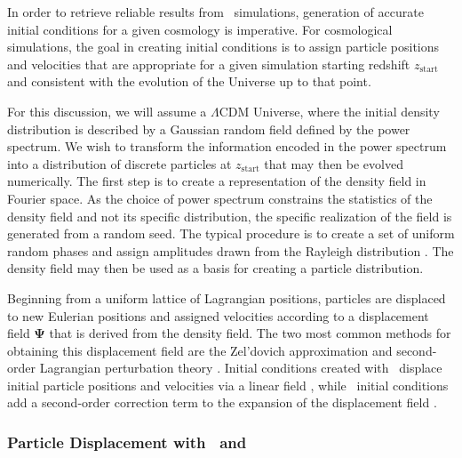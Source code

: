 In order to retrieve reliable results from \nbody\ simulations, generation of accurate initial conditions for a given cosmology is imperative.  For cosmological simulations, the goal in creating initial conditions is to assign particle positions and velocities that are appropriate for a given simulation starting redshift $z_{\mathrm{start}}$ and consistent with the evolution of the Universe up to that point.

For this discussion, we will assume a $\Lambda$CDM Universe, where the initial density distribution is described by a Gaussian random field defined by the power spectrum.  We wish to transform the information encoded in the power spectrum into a distribution of discrete particles at $z_{\mathrm{start}}$ that may then be evolved numerically.  The first step is to create a representation of the density field in Fourier space.  As the choice of power spectrum constrains the statistics of the density field and not its specific distribution, the specific realization of the field is generated from a random seed.  The typical procedure is to create a set of uniform random phases and assign amplitudes drawn from the Rayleigh distribution \citep{1985ApJS...57..241E}.  The density field may then be used as a basis for creating a particle distribution.

Beginning from a uniform lattice of Lagrangian positions, particles are displaced to new Eulerian positions and assigned velocities according to a displacement field $\boldsymbol{\Psi}$ that is derived from the density field.  The two most common methods for obtaining this displacement field are the Zel'dovich approximation \citep[\za,][]{1970A&A.....5...84Z} and second-order Lagrangian perturbation theory \citep[\lpt,][]{1994MNRAS.267..811B, 1994A&A...288..349B, 1995A&A...296..575B, 1998MNRAS.299.1097S}.  Initial conditions created with \za\ displace initial particle positions and velocities via a linear field \citep{1983MNRAS.204..891K, 1985ApJS...57..241E}, while \lpt\ initial conditions add a second-order correction term to the expansion of the displacement field \citep{1998MNRAS.299.1097S, 2005ApJ...634..728S, 2010MNRAS.403.1859J}.



\subsubsection{Particle Displacement with \za\ and \lpt}
\label{subsubsec:computational_theory--perturbation_theory--particle_displacement}



